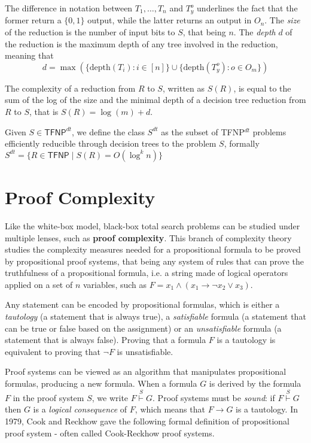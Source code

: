 The difference in notation between $T_1, \ldots, T_n$ and $T_y^o$ underlines the fact that the former return a $\{0,1\}$ output, while the latter returns an output in $O_n$. The \textit{size} of the reduction is the number of input bits to $S$, that being $n$. The \textit{depth} $d$ of the reduction is the maximum depth of any tree involved in the reduction, meaning that
\[d = \max (\{\mathrm{depth}(T_i) : i \in [n]\} \cup \{\mathrm{depth}(T_y^o) : o \in O_m\})\]

The complexity of a reduction from $R$ to $S$, written as $S(R)$, is equal to the sum of the log of the size and the minimal depth of a decision tree reduction from $R$ to $S$, that is $S(R) = \log(m) + d$.

\begin{definition}
 Given $S \in \mathsf{TFNP}^{dt}$, we define the class $S^{dt}$ as the subset of \textsf{TFNP}$^{dt}$ problems efficiently reducible through decision trees to the problem $S$, formally $S^{dt} = \{R \in \mathsf{TFNP} \mid S(R) = O(\log^k n)\}$
\end{definition}

\section{Proof Complexity}

Like the white-box model, black-box total search problems can be studied under multiple lenses, such as \textbf{proof complexity}. This branch of complexity theory studies the complexity measures needed for a propositional formula to be proved by propositional proof systems, that being any system of rules that can prove the truthfulness of a propositional formula, i.e. a string made of logical operators applied on a set of $n$ variables, such as $F = x_1 \land (x_1 \to \lnot x_2 \lor x_3)$.

Any statement can be encoded by propositional formulas, which is either a \textit{tautology} (a statement that is always true), a \textit{satisfiable} formula (a statement that can be true or false based on the assignment) or an \textit{unsatisfiable} formula (a statement that is always false). Proving that a formula $F$ is a tautology is equivalent to proving that $\lnot F$ is unsatisfiable.

Proof systems can be viewed as an algorithm that manipulates propositional formulas, producing a new formula. When a formula $G$ is derived by the formula $F$ in the proof system $S$, we write $F \stackrel{S}{\vdash} G$. Proof systems must be \textit{sound}: if $F \stackrel{S}{\vdash} G$ then $G$ is a \textit{logical consequence} of $F$, which means that $F \to G$ is a tautology. In 1979, Cook and Reckhow gave the following formal definition of propositional proof system - often called Cook-Reckhow proof systems.

